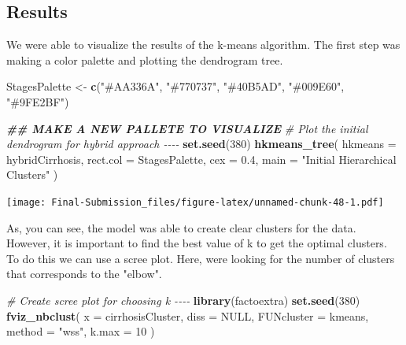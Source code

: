\documentclass[
]{article}
\newenvironment{Shaded}{\begin{snugshade}}{\end{snugshade}}
\newcommand{\AttributeTok}[1]{\textcolor[rgb]{0.13,0.29,0.53}{#1}}
\newcommand{\CommentTok}[1]{\textcolor[rgb]{0.56,0.35,0.01}{\textit{#1}}}
\newcommand{\ConstantTok}[1]{\textcolor[rgb]{0.56,0.35,0.01}{#1}}
\newcommand{\DecValTok}[1]{\textcolor[rgb]{0.00,0.00,0.81}{#1}}
\newcommand{\DocumentationTok}[1]{\textcolor[rgb]{0.56,0.35,0.01}{\textbf{\textit{#1}}}}
\newcommand{\FloatTok}[1]{\textcolor[rgb]{0.00,0.00,0.81}{#1}}
\newcommand{\FunctionTok}[1]{\textcolor[rgb]{0.13,0.29,0.53}{\textbf{#1}}}
\newcommand{\NormalTok}[1]{#1}
\newcommand{\OtherTok}[1]{\textcolor[rgb]{0.56,0.35,0.01}{#1}}
\newcommand{\StringTok}[1]{\textcolor[rgb]{0.31,0.60,0.02}{#1}}
\begin{document}
\hypertarget{results-1}{%
\subsection{Results}\label{results-1}}

We were able to visualize the results of the k-means algorithm. The
first step was making a color palette and plotting the dendrogram tree.

\begin{Shaded}
\begin{Highlighting}[]
\NormalTok{StagesPalette }\OtherTok{\textless{}{-}} \FunctionTok{c}\NormalTok{(}\StringTok{"\#AA336A"}\NormalTok{, }\StringTok{"\#770737"}\NormalTok{, }\StringTok{"\#40B5AD"}\NormalTok{, }\StringTok{"\#009E60"}\NormalTok{, }\StringTok{"\#9FE2BF"}\NormalTok{)}
\end{Highlighting}
\end{Shaded}

\begin{Shaded}
\begin{Highlighting}[]
\DocumentationTok{\#\# MAKE A NEW PALLETE TO VISUALIZE}
\CommentTok{\# Plot the initial dendrogram for hybrid approach {-}{-}{-}{-}}
\FunctionTok{set.seed}\NormalTok{(}\DecValTok{380}\NormalTok{)}
\FunctionTok{hkmeans\_tree}\NormalTok{(}
  \AttributeTok{hkmeans =}\NormalTok{ hybridCirrhosis,}
  \AttributeTok{rect.col =}\NormalTok{ StagesPalette,}
  \AttributeTok{cex =} \FloatTok{0.4}\NormalTok{,}
  \AttributeTok{main =} \StringTok{"Initial Hierarchical Clusters"}
\NormalTok{)}
\end{Highlighting}
\end{Shaded}

\texttt{[image: Final-Submission\_files/figure-latex/unnamed-chunk-48-1.pdf]}

As, you can see, the model was able to create clear clusters for the
data. However, it is important to find the best value of k to get the
optimal clusters. To do this we can use a scree plot. Here,
we\textquotesingle re looking for the number of clusters that
corresponds to the "elbow".

\begin{Shaded}
\begin{Highlighting}[]
\CommentTok{\# Create scree plot for choosing k {-}{-}{-}{-}}
\FunctionTok{library}\NormalTok{(factoextra)}
\FunctionTok{set.seed}\NormalTok{(}\DecValTok{380}\NormalTok{)}
\FunctionTok{fviz\_nbclust}\NormalTok{(}
  \AttributeTok{x =}\NormalTok{ cirrhosisCluster,}
  \AttributeTok{diss =} \ConstantTok{NULL}\NormalTok{,}
  \AttributeTok{FUNcluster =}\NormalTok{ kmeans,}
  \AttributeTok{method =} \StringTok{"wss"}\NormalTok{,}
  \AttributeTok{k.max =} \DecValTok{10}
\NormalTok{)}
\end{Highlighting}
\end{Shaded}
\end{document}
